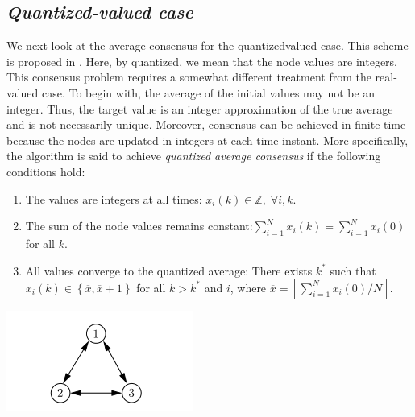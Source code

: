 \documentclass[12pt]{article}
\begin{document}
			\subsection{\textit{Quantized-valued case}} 
			We next look at the average consensus for the quantizedvalued case. This scheme is proposed in \cite{bib13}. Here, by quantized, we mean that the node values are integers. This consensus problem requires a somewhat different treatment from the real-valued case. To begin with, the average of the initial values may not be an integer. Thus, the target value is an integer approximation of the true average and is not necessarily unique. Moreover, consensus can be achieved in finite time because the nodes are updated in integers at each time instant.  More specifically, the algorithm is said to achieve 
			\textit{quantized 	average consensus} if the following conditions hold:  
			\begin{enumerate}[label=(\roman*)] 	
				\item The values are integers at all times: $x_{i}(k)\in \mathbb{Z}, \; \forall{i, k}$. 	
				\item The sum of the node values remains constant:$\sum_{i=1}^{N}x_{i}(k)=\sum_{i=1}^{N}x_{i}(0)$ for all $k$. 	
				\item All values converge to the quantized average: There exists $k^{*}$ such that $x_{i}(k)\in \left\{ \overline{x}, \overline{x}+1 \right\}$ for all $k > k^{*}$ and $i$, where  $\overline{x}=\left\lfloor \sum_{i=1}^{N}x_{i}(0)/N \right\rfloor$. 
			\end{enumerate}
			\begin{center}
				\includegraphics[width=0.49\linewidth]{3.png}
			\end{center}
			 
\end{document}
